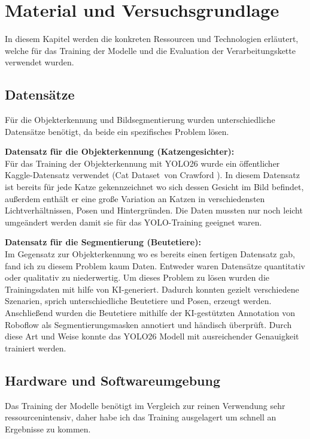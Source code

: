\chapter{Material und Versuchsgrundlage}
\label{sec:material}

In diesem Kapitel werden die konkreten Ressourcen und Technologien erläutert, welche für das Training der Modelle und die Evaluation der Verarbeitungskette verwendet wurden.

\section{Datensätze}
Für die Objekterkennung und Bildsegmentierung wurden unterschiedliche Datensätze benötigt, da beide ein spezifisches Problem lösen.

\textbf{Datensatz für die Objekterkennung (Katzengesichter):} \\
Für das Training der Objekterkennung mit YOLO26 wurde ein öffentlicher Kaggle-Datensatz verwendet (\glqq Cat Dataset\grqq\ von Crawford \cite{kaggle2024cat}). In diesem Datensatz ist bereits für jede Katze gekennzeichnet wo sich dessen Gesicht im Bild befindet, außerdem enthält er eine große Variation an Katzen in verschiedensten Lichtverhältnissen, Posen und Hintergründen. Die Daten mussten nur noch leicht umgeändert werden damit sie für das YOLO-Training geeignet waren.

\textbf{Datensatz für die Segmentierung (Beutetiere):} \\
Im Gegensatz zur Objekterkennung wo es bereits einen fertigen Datensatz gab, fand ich zu diesem Problem kaum Daten. Entweder waren Datensätze quantitativ oder qualitativ zu niederwertig. Um dieses Problem zu lösen wurden die Trainingsdaten mit hilfe von KI-generiert. Dadurch konnten gezielt verschiedene Szenarien, sprich unterschiedliche Beutetiere und Posen, erzeugt werden. Anschließend wurden die Beutetiere mithilfe der KI-gestützten Annotation von Roboflow \cite{roboflow2025} als Segmentierungsmasken annotiert und händisch überprüft. Durch diese Art und Weise konnte das YOLO26 Modell mit ausreichender Genauigkeit trainiert werden.

\section{Hardware und Softwareumgebung}
Das Training der Modelle benötigt im Vergleich zur reinen Verwendung sehr ressourcenintensiv, daher habe ich das Training ausgelagert um schnell an Ergebnisse zu kommen.

